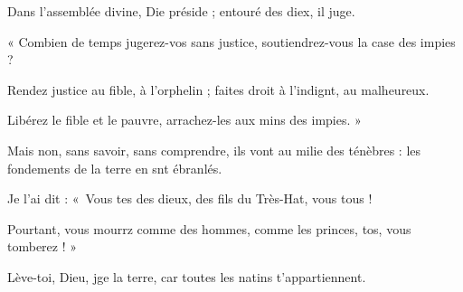 \item Dans l’assemblée divine, Die préside ;\psstar{} entouré des diex, il juge.
\item « Combien de temps jugerez-vos sans justice,\psstar{} soutiendrez-vous la case des impies ?
\item Rendez justice au fible, à l’orphelin ;\psstar{} faites droit à l’indignt, au malheureux.
\item Libérez le fible et le pauvre,\psstar{} arrachez-les aux mins des impies. »
\item Mais non, sans savoir, sans comprendre,\pscross{} ils vont au milie des ténèbres :\psstar{} les fondements de la terre en snt ébranlés.
\item Je l’ai dit : « Vous tes des dieux,\psstar{} des fils du Très-Hat, vous tous !
\item Pourtant, vous mourrz comme des hommes,\psstar{} comme les princes, tos, vous tomberez ! »
\item Lève-toi, Dieu, jge la terre,\psstar{} car toutes les natins t’appartiennent.